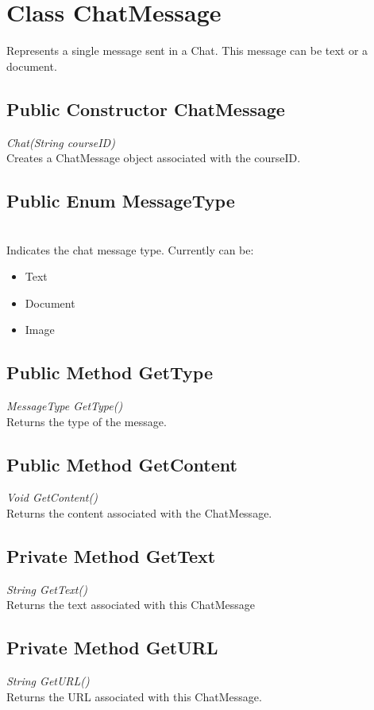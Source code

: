 \documentclass[16pt]{scrreprt}
\begin{document}
\section{Class ChatMessage}
Represents a single message sent in a Chat. This message can be text or a document.

\subsection{Public Constructor ChatMessage}
\textit{Chat(String courseID)} \\
Creates a ChatMessage object associated with the courseID.

\subsection{Public Enum MessageType}
\textit{} \\
Indicates the chat message type. Currently can be:
\begin{itemize}
	\item Text
	\item Document
	\item Image
\end{itemize}

\subsection{Public Method GetType}
\textit{MessageType GetType()} \\
Returns the type of the message.

\subsection{Public Method GetContent}
\textit{Void GetContent()} \\
Returns the content associated with the ChatMessage.

\subsection{Private Method GetText}
\textit{String GetText()} \\
Returns the text associated with this ChatMessage

\subsection{Private Method GetURL}
\textit{String GetURL()} \\
Returns the URL associated with this ChatMessage.
\end{document}

